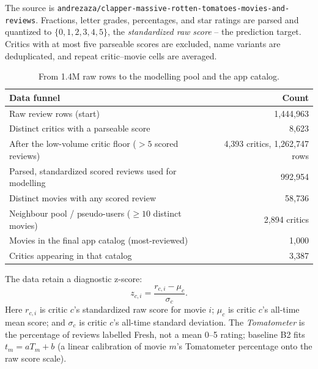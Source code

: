 \documentclass[11pt]{article}
\begin{document}
The source is \texttt{andrezaza/clapper-massive-rotten-tomatoes-movies-and-reviews}. Fractions, letter grades, percentages, and star ratings are parsed and quantized to $\{0,1,2,3,4,5\}$, the \emph{standardized raw score} -- the prediction target. Critics with at most five parseable scores are excluded, name variants are deduplicated, and repeat critic--movie cells are averaged.

\begin{table}[h]
\centering
\small
\begin{tabular}{lr}
\toprule
\textbf{Data funnel} & \textbf{Count} \\
\midrule
Raw review rows (start) & 1{,}444{,}963 \\
Distinct critics with a parseable score & 8{,}623 \\
After the low-volume critic floor ($>5$ scored reviews) & 4{,}393 critics, 1{,}262{,}747 rows \\
Parsed, standardized scored reviews used for modelling & 992{,}954 \\
Distinct movies with any scored review & 58{,}736 \\
Neighbour pool / pseudo-users ($\geq 10$ distinct movies) & 2{,}894 critics \\
Movies in the final app catalog (most-reviewed) & 1{,}000 \\
Critics appearing in that catalog & 3{,}387 \\
\bottomrule
\end{tabular}
\caption{From 1.4M raw rows to the modelling pool and the app catalog.}
\label{tab:funnel}
\end{table}

The data retain a diagnostic z-score:
\begin{equation}
z_{c,i}=\frac{r_{c,i}-\mu_c}{\sigma_c}.
\label{eq:zscore}
\end{equation}
Here $r_{c,i}$ is critic $c$'s standardized raw score for movie $i$; $\mu_c$ is critic $c$'s all-time mean score; and $\sigma_c$ is critic $c$'s all-time standard deviation. The \emph{Tomatometer} is the percentage of reviews labelled Fresh, not a mean 0--5 rating; baseline B2 fits $t_m=aT_m+b$ (a linear calibration of movie $m$'s Tomatometer percentage onto the raw score scale).
\end{document}
